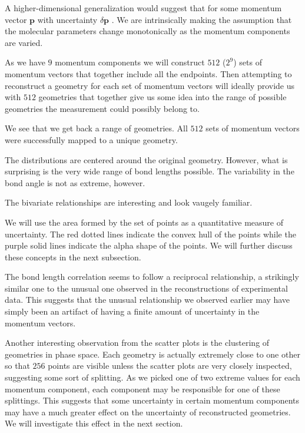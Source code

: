 A higher-dimensional generalization would suggest that for some momentum vector $\mathbf{p}$ with uncertainty $\delta\mathbf{p}$ . We are intrinsically making the assumption that the molecular parameters change monotonically as the momentum components are varied.

As we have $9$ momentum components we will construct $512$ ($2^9$) sets of momentum vectors that together include all the endpoints. Then attempting to reconstruct a geometry for each set of momentum vectors will ideally provide us with $512$ geometries that together give us some idea into the range of possible geometries the measurement could possibly belong to.


We see that we get back a range of geometries. All $512$ sets of momentum vectors were successfully mapped to a unique geometry.

The distributions are centered around the original geometry. However, what is surprising is the very wide range of bond lengths possible. The variability in the bond angle is not as extreme, however.

The bivariate relationships are interesting and look vaugely familiar.

We will use the area formed by the set of points as a quantitative measure of uncertainty. The red dotted lines indicate the convex hull of the points while the purple solid lines indicate the alpha shape of the points. We will further discuss these concepts in the next subsection.

The bond length correlation seems to follow a reciprocal relationship, a strikingly similar one to the unusual one observed in the reconstructions of experimental data. This suggests that the unusual relationship we observed earlier may have simply been an artifact of having a finite amount of uncertainty in the momentum vectors.

Another interesting observation from the scatter plots is the clustering of geometries in phase space. Each geometry is actually extremely close to one other so that $256$ points are visible unless the scatter plots are very closely inspected, suggesting some sort of splitting. As we picked one of two extreme values for each momentum component, each component may be responsible for one of these splittings. This suggests that some uncertainty in certain momentum components may have a much greater effect on the uncertainty of reconstructed geometries. We will investigate this effect in the next section.

